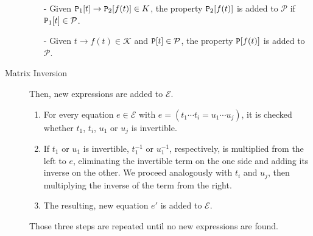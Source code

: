 \begin{description}
\begin{itemize}
\item[-] Given $\text{\ttfamily P}_1[t] \rightarrow \text{\ttfamily P}_2[f(t)] \in K$, the property $\text{\ttfamily P}_2[f(t)]$ is added to $\mathcal{P}$ if $\text{\ttfamily P}_1[t] \in \mathcal{P}$.

\item[-] Given $t \rightarrow f(t) \in \mathcal{K}$ and $\text{\ttfamily P}[t] \in \mathcal{P}$, the property $\text{\ttfamily P}[f(t)]$ is added to $\mathcal{P}$.

\end{itemize}

\item[Matrix Inversion] Then, new expressions are added to $\mathcal{E}$.
\begin{enumerate}
\item For every equation $e \in \mathcal{E}$ with $e = ( t_1 \cdots t_i = u_1 \cdots u_j )$, it is checked whether $t_1$, $t_i$, $u_1$ or $u_j$ is invertible. 
\item If $t_1$ or $u_1$ is invertible, $t_1^{-1}$ or $u_1^{-1}$, respectively, is multiplied from the left to $e$, eliminating the invertible term on the one side and adding its inverse on the other. We proceed analogously with $t_i$ and $u_j$, then multiplying the inverse of the term from the right.
\item The resulting, new equation $e'$ is added to $\mathcal{E}$.
\end{enumerate}

Those three steps are repeated until no new expressions are found.



\end{description}
